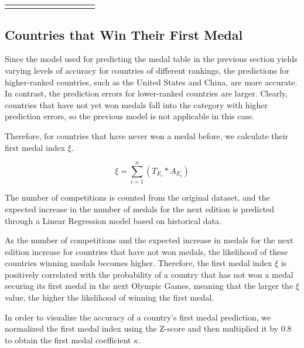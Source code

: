 \documentclass[12pt]{article}  %
\begin{document}
\begin{longtable}{l|c|c|c|c|c|c|c|c|c|c}
	\multicolumn{1}{l}{} & \multicolumn{1}{c}{}                                                   & \multicolumn{1}{c}{}                                                   & \multicolumn{1}{c}{}                                                   & \multicolumn{1}{c}{}                                                   & \multicolumn{1}{c}{}                                                   & \multicolumn{1}{c}{}                                                   & \multicolumn{1}{c}{}      & \multicolumn{1}{c}{}        & \multicolumn{1}{c}{}        &                           
\end{longtable}
\subsection{Countries that Win Their First Medal}
Since the model used for predicting the medal table in the previous section yields varying levels of accuracy for countries of different rankings, the predictions for higher-ranked countries, such as the United States and China, are more accurate. In contrast, the prediction errors for lower-ranked countries are larger. Clearly, countries that have not yet won medals fall into the category with higher prediction errors, so the previous model is not applicable in this case.

Therefore, for countries that have never won a medal before, we calculate their first medal index $\xi$.

\begin{equation}
	\xi = \sum_{i=1}^{n} \left( T_{E_i} \ast A_{E_i} \right)
\end{equation}





The number of competitions is counted from the original dataset, and the expected increase in the number of medals for the next edition is predicted through a Linear Regression model based on historical data.

As the number of competitions and the expected increase in medals for the next edition increase for countries that have not won medals, the likelihood of these countries winning medals becomes higher. Therefore, the first medal index $\xi$ is positively correlated with the probability of a country that has not won a medal securing its first medal in the next Olympic Games, meaning that the larger the $\xi$ value, the higher the likelihood of winning the first medal.

In order to visualize the accuracy of a country's first medal prediction, we normalized the first medal index using the Z-score and then multiplied it by 0.8 to obtain the first medal coefficient $\kappa$.
\end{document}

